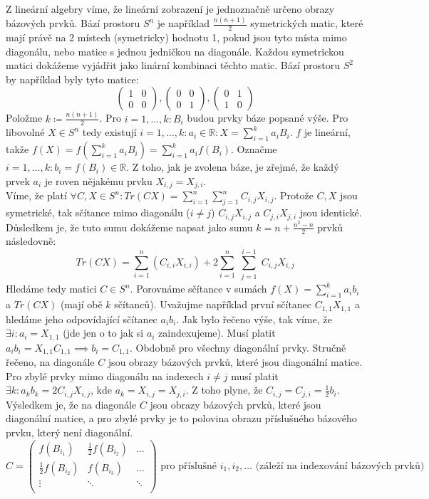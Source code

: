 \documentclass[12pt, a4paper]{article}
\begin{document}
\section{}
Z lineární algebry víme, že lineární zobrazení je jednoznačně určeno obrazy bázových prvků. Bází prostoru $S^n$ je například $\frac{n(n+1)}{2}$ symetrických matic, které mají právě na 2 místech (symetricky) hodnotu 1, pokud jsou tyto místa mimo diagonálu, nebo matice s jednou jedničkou na diagonále. Každou symetrickou matici dokážeme vyjádřit jako linární kombinaci těchto matic. Bází prostoru $S^2$ by například byly tyto matice:
\[
\begin{pmatrix}
1 & 0\\
0 & 0
\end{pmatrix}, 
\begin{pmatrix}
0 & 0\\
0 & 1
\end{pmatrix},
\begin{pmatrix}
0 & 1\\
1 & 0
\end{pmatrix}
\]
Položme $k \coloneqq \frac{n(n+1)}{2}$. Pro $i=1,\dots,k: B_i$ budou prvky báze popsané výše. Pro libovolné $X \in S^n$ tedy existují $i=1,\dots,k: a_i \in \mathbb{R}: X = \sum_{i=1}^k a_iB_i$. $f$ je lineární, takže $f(X)=f(\sum_{i=1}^k a_iB_i)=\sum_{i=1}^k a_if(B_i)$. Označme $i=1,\dots,k: b_i = f(B_i) \in \mathbb{R}$. Z toho, jak je zvolena báze, je zřejmé, že každý prvek $a_i$ je roven nějakému prvku $X_{i,j}=X_{j,i}$.\\
Víme, že platí $\forall C,X \in S^n: Tr(CX)= \sum_{i=1}^{n} \sum_{j=1}^{n} C_{i,j}X_{i,j}$. Protože $C,X$ jsou symetrické, tak sčítance mimo diagonálu ($i\neq j$) $C_{i,j}X_{i,j}$ a $C_{j,i}X_{j,i}$ jsou identické. Důsledkem je, že tuto sumu dokážeme napsat jako sumu $k=n+\frac{n^2-n}{2}$ prvků následovně:
\[
Tr(CX)=\sum_{i=1}^n(C_{i,i}X_{i,i})+2\sum_{i=1}^{n} \sum_{\substack{j=1}}^{i-1} C_{i,j}X_{i,j}
\]
Hledáme tedy matici $C \in S^n$. Porovnáme sčítance v sumách $f(X)=\sum_{i=1}^k a_ib_i$ a $Tr(CX)$ (mají obě $k$ sčítanců). Uvažujme například první sčítanec $C_{1,1}X_{1,1}$ a hledáme jeho odpovídající sčítanec $a_ib_i$. Jak bylo řečeno výše, tak víme, že $\exists i: a_i = X_{1,1}$ (jde jen o to jak si $a_i$ zaindexujeme). Musí platit $a_ib_i = X_{1,1}C_{1,1} \implies b_i = C_{1,1}$. Obdobně pro všechny diagonální prvky. Stručně řečeno, na diagonále $C$ jsou obrazy bázových prvků, které jsou diagonální matice. Pro zbylé prvky mimo diagonálu na indexech $i\neq j$ musí platit $\exists k: a_kb_k = 2C_{i,j}X_{i,j}$, kde $a_k = X_{i,j}=X_{j,i}$. Z toho plyne, že $C_{i,j}=C_{j,i}=\frac{1}{2}b_i$.\\
Výsledkem je, že na diagonále $C$ jsou obrazy bázových prvků, které jsou diagonální matice, a pro zbylé prvky je to polovina obrazu příslušného bázového prvku, který není diagonální.
\[
C = \begin{pmatrix}
f(B_{i_1}) & \frac{1}{2}f(B_{i_2}) & \dots \\
\frac{1}{2}f(B_{i_2}) & f(B_{i_3}) & \dots \\
\vdots & \ddots & \ddots \\
\end{pmatrix} \text{ pro příslušné $i_1,i_2,\dots$ (záleží na indexování bázových prvků)}
\]
\end{document}
